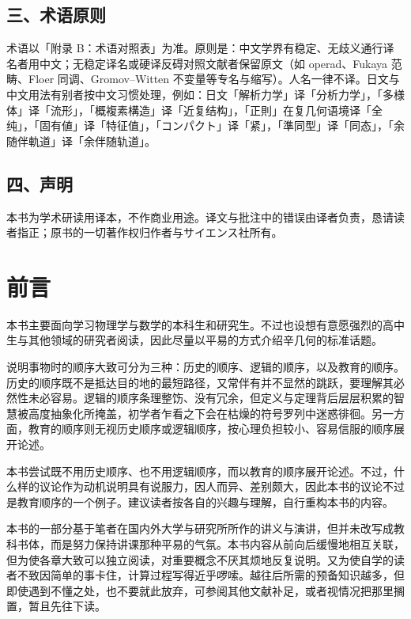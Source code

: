 \section*{三、术语原则}

术语以「附录 B：术语对照表」为准。原则是：中文学界有稳定、无歧义通行译名者用中文；无稳定译名或硬译反碍对照文献者保留原文（如 operad、Fukaya 范畴、Floer 同调、Gromov–Witten 不变量等专名与缩写）。人名一律不译。日文与中文用法有别者按中文习惯处理，例如：日文「解析力学」译「分析力学」，「多様体」译「流形」，「概複素構造」译「近复结构」，「正則」在复几何语境译「全纯」，「固有値」译「特征值」，「コンパクト」译「紧」，「準同型」译「同态」，「余随伴軌道」译「余伴随轨道」。

\section*{四、声明}

本书为学术研读用译本，不作商业用途。译文与批注中的错误由译者负责，恳请读者指正；原书的一切著作权归作者与サイエンス社所有。

\clearpage

\chapter*{前言}

本书主要面向学习物理学与数学的本科生和研究生。不过也设想有意愿强烈的高中生与其他领域的研究者阅读，因此尽量以平易的方式介绍辛几何的标准话题。

说明事物时的顺序大致可分为三种：历史的顺序、逻辑的顺序，以及教育的顺序。历史的顺序既不是抵达目的地的最短路径，又常伴有并不显然的跳跃，要理解其必然性未必容易。逻辑的顺序条理整饬、没有冗余，但定义与定理背后层层积累的智慧被高度抽象化所掩盖，初学者乍看之下会在枯燥的符号罗列中迷惑徘徊。另一方面，教育的顺序则无视历史顺序或逻辑顺序，按心理负担较小、容易信服的顺序展开论述。

本书尝试既不用历史顺序、也不用逻辑顺序，而以教育的顺序展开论述。不过，什么样的议论作为动机说明具有说服力，因人而异、差别颇大，因此本书的议论不过是教育顺序的一个例子。建议读者按各自的兴趣与理解，自行重构本书的内容。

本书的一部分基于笔者在国内外大学与研究所所作的讲义与演讲，但并未改写成教科书体，而是努力保持讲课那种平易的气氛。本书内容从前向后缓慢地相互关联，但为使各章大致可以独立阅读，对重要概念不厌其烦地反复说明。又为使自学的读者不致因简单的事卡住，计算过程写得近乎啰嗦。越往后所需的预备知识越多，但即使遇到不懂之处，也不要就此放弃，可参阅其他文献补足，或者视情况把那里搁置，暂且先往下读。

